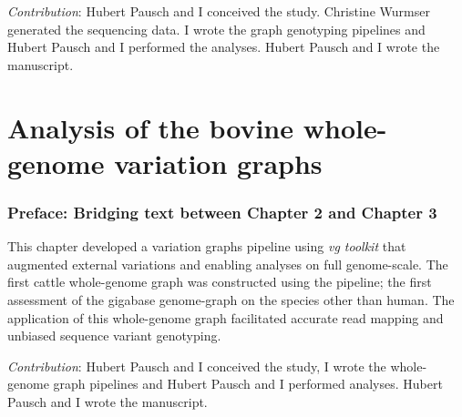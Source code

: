 \documentclass[11 pt, a4paper, notitlepage]{report}
\begin{document}
\emph{Contribution}: Hubert Pausch and I conceived the study. Christine Wurmser generated the sequencing data. I wrote the graph genotyping pipelines and Hubert Pausch and I performed the analyses. Hubert Pausch and I wrote the manuscript. 




\chapter[Bovine whole-genome variations graphs]{\LARGE{Analysis of the bovine whole-genome variation graphs}}
\label{chap:wholegraph}

\subsection*{Preface: Bridging text between Chapter 2 and Chapter 3}
\normalsize
This chapter developed a variation graphs pipeline using \emph{vg toolkit} that augmented external variations and enabling analyses on full genome-scale. The first cattle whole-genome graph was constructed using the pipeline; the first assessment of the gigabase genome-graph on the species other than human. The application of this whole-genome graph facilitated accurate read mapping and unbiased sequence variant genotyping. \\

\bigskip

\emph{Contribution}: Hubert Pausch and I conceived the study, I wrote the whole-genome graph pipelines and Hubert Pausch and I performed analyses. Hubert Pausch and I wrote the manuscript. 


\end{document}
